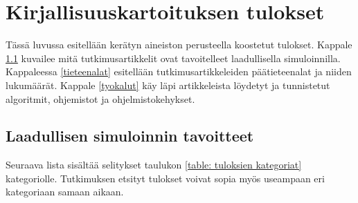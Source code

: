 \documentclass[utf8]{gradu3}
\begin{document}
\chapter{Kirjallisuuskartoituksen tulokset}
\begin{comment}
    Tulokset on aika geneerinen nimi. Kannattanee kuvailla vähän tarkemmin.
\end{comment}
Tässä luvussa esitellään kerätyn aineiston perusteella koostetut tulokset.
Kappale \ref{simulaatiotulokset} kuvailee 
mitä tutkimusartikkelit ovat tavoitelleet laadullisella simuloinnilla.
Kappaleessa \ref{tieteenalat} esitellään tutkimusartikkeleiden 
päätieteenalat ja niiden lukumäärät. 
Kappale \ref{tyokalut} käy läpi artikkeleista löydetyt 
ja tunnistetut algoritmit, ohjemistot ja ohjelmistokehykset. 

\section{Laadullisen simuloinnin tavoitteet} \label{simulaatiotulokset}
Seuraava lista sisältää selitykset taulukon \ref{table: tuloksien kategoriat} kategoriolle.
Tutkimuksen etsityt tulokset voivat sopia myös useampaan eri kategoriaan samaan aikaan. 
\end{document}

